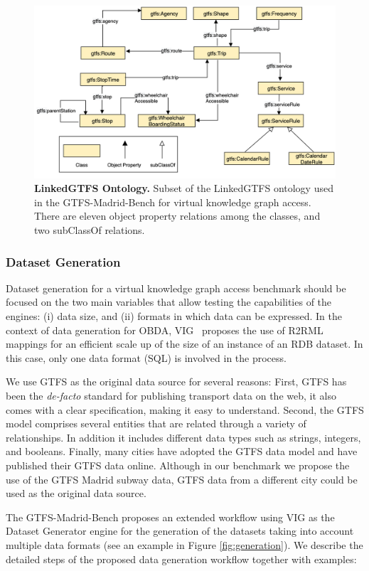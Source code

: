 \begin{figure}
    \centering
    \includegraphics[width=0.8\linewidth]{figures/GTFSontology.png}
    \caption[The LinkedGTFS Ontology]{\textbf{LinkedGTFS Ontology.} Subset of the LinkedGTFS ontology used in the GTFS-Madrid-Bench for virtual knowledge graph access. There are eleven object property relations among the classes, and two subClassOf relations.}
    \label{fig:gtfsOntology}
\end{figure}

\subsubsection{Dataset Generation}

Dataset generation for a virtual knowledge graph access benchmark should be focused on the two main variables that allow testing the capabilities of the engines: (i) data size, and (ii) formats in which data can be expressed. In the context of data generation for OBDA, VIG~\citep{lantivig} proposes the use of R2RML mappings for an efficient scale up of the size of an instance of an RDB dataset. In this case, only one data format (SQL) is involved in the process. 

We use GTFS as the original data source for several reasons: First, GTFS has been the \textit{de-facto} standard for publishing transport data on the web, it also comes with a clear specification, making it easy to understand. Second, the GTFS model comprises several entities that are related through a variety of relationships. In addition it includes different data types such as strings, integers, and booleans. Finally, many cities have adopted the GTFS data model and have published their GTFS data online. Although in our benchmark we propose the use of the GTFS Madrid subway data, GTFS data from a different city could be used as the original data source.

The GTFS-Madrid-Bench proposes an extended workflow using VIG as the Dataset Generator engine for the generation of the datasets taking into account multiple data formats (see an example in Figure \ref{fig:generation}). We describe the detailed steps of the proposed data generation workflow together with examples:

